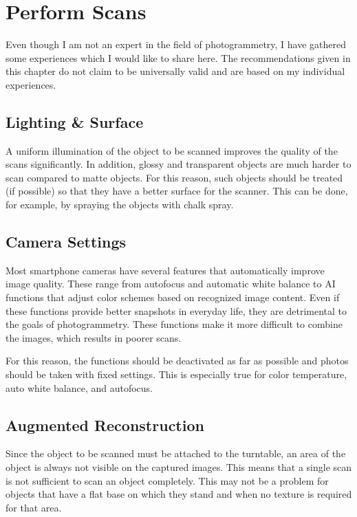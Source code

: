 \chapter{Perform Scans}
\label{c:performingScans}
Even though I am not an expert in the field of photogrammetry, I have gathered some experiences which I would like to share here. The recommendations given in this chapter do not claim to be universally valid and are based on my individual experiences.%

\section{Lighting \& Surface}%
A uniform illumination of the object to be scanned improves the quality of the scans significantly. In addition, glossy and transparent objects are much harder to scan compared to matte objects. For this reason, such objects should be treated (if possible) so that they have a better surface for the scanner. This can be done, for example, by spraying the objects with chalk spray.%

\section{Camera Settings}%
Most smartphone cameras have several features that automatically improve image quality. These range from autofocus and automatic white balance to AI functions that adjust color schemes based on recognized image content. Even if these functions provide better snapshots in everyday life, they are detrimental to the goals of photogrammetry. These functions make it more difficult to combine the images, which results in poorer scans.%

For this reason, the functions should be deactivated as far as possible and photos should be taken with fixed settings. This is especially true for color temperature, auto white balance, and autofocus.%

\section{Augmented Reconstruction}%
Since the object to be scanned must be attached to the turntable, an area of the object is always not visible on the captured images. This means that a single scan is not sufficient to scan an object completely. This may not be a problem for objects that have a flat base on which they stand and when no texture is required for that area.%

